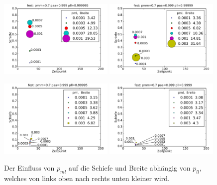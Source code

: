 \begin{figure}[h]
\includegraphics[width=0.49\textwidth]{bilder/pml/3fest_07_p_0999_0999995}
\includegraphics[width=0.49\textwidth]{bilder/pml/3fest_07_p_0999_099999}

\vspace*{5pt}

\includegraphics[width=0.49\textwidth]{bilder/pml/3fest_07_p_0999_099995}
\includegraphics[width=0.49\textwidth]{bilder/pml/3fest_07_p_0999_09999}
\caption[Der Einfluss von $p_{ml}$ auf die Schiefe und Breite abhängig von $p_{ll}$]{Der Einfluss von $p_{ml}$ auf die Schiefe und Breite abhängig von $p_{ll}$, welches von links oben nach rechts unten kleiner wird.}
\label{einfluss_pml_1}
\end{figure}

